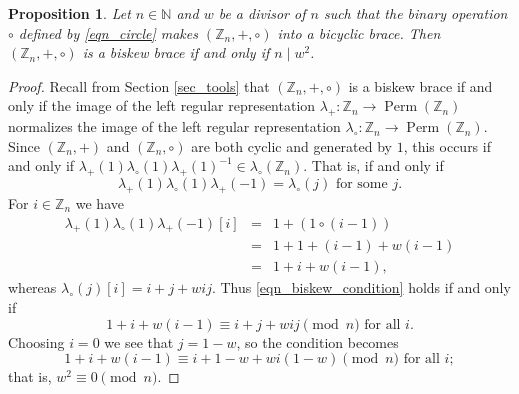 \documentclass[10pt,a4paper]{amsart}
\newtheorem{proposition}{Proposition}
\newcommand{\N}{\mathbb{N}}
\DeclareMathOperator{\Perm}{\mbox{Perm}}
\newcommand{\Z}{\mathbb{Z}}
\begin{document}
\begin{proposition} \label{prop_biskew_general}
Let $ n \in \N $ and $ w $ be a divisor of $ n $ such that the binary operation $ \circ $ defined by \eqref{eqn_circle} makes $ (\Z_{n},+,\circ) $ into a bicyclic brace. Then $ (\Z_{n},+,\circ) $ is a biskew brace if and only if $ n \mid w^{2} $.  
\end{proposition}

\begin{proof}
Recall from Section \ref{sec_tools} that $ (\Z_{n},+,\circ) $ is a biskew brace if and only if the image of the left regular representation $ \lambda_{+} : \Z_{n} \rightarrow \Perm(\Z_{n}) $ normalizes the image of the left regular representation $ \lambda_{\circ} : \Z_{n} \rightarrow \Perm(\Z_{n}) $. Since $ (\Z_{n},+) $ and $ (\Z_{n},\circ) $ are both cyclic and generated by $ 1 $, this occurs if and only if $ \lambda_{+}(1) \lambda_{\circ}(1) \lambda_{+}(1)^{-1} \in \lambda_{\circ}(\Z_{n}) $. That is, if and only if 
\begin{equation} \label{eqn_biskew_condition}
\lambda_{+}(1) \lambda_{\circ}(1) \lambda_{+}(-1) = \lambda_{\circ}(j) \mbox{ for some } j.
\end{equation}
For $ i \in \Z_{n} $ we have
\begin{eqnarray*}
\lambda_{+}(1) \lambda_{\circ}(1) \lambda_{+}(-1) [i] & = & 1+( 1 \circ (i-1) ) \\
& = & 1 + 1+(i-1)+w(i-1) \\
& = & 1+i+w(i-1),
\end{eqnarray*}
whereas $ \lambda_{\circ}(j)[i] = i+j+wij $. Thus \eqref{eqn_biskew_condition} holds if and only if 
\[ 1+i+w(i-1) \equiv i+j+wij \pmod{n} \mbox{ for all } i. \]
Choosing $ i=0 $ we see that $ j=1-w $, so the condition becomes 
\[ 1+i+w(i-1) \equiv i+1-w+wi(1-w) \pmod{n} \mbox{ for all } i; \]
that is, $ w^{2} \equiv 0 \pmod{n} $. 
\end{proof}
\end{document}
